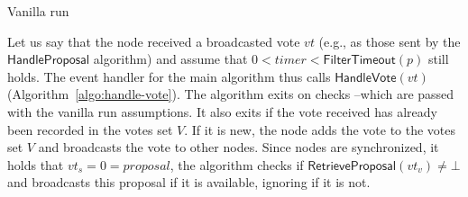 \documentclass[10pt,a4paper]{article}
\begin{document}
\begin{section}{Vanilla run}
    
    Let us say that the node received a broadcasted vote $vt$ (e.g., as those sent by the $\mathsf{HandleProposal}$ 
    algorithm) and assume that $0<timer<\mathsf{FilterTimeout}(p)$ still holds.
    The event handler for the main algorithm thus calls $\mathsf{HandleVote}(vt)$ (Algorithm~\ref{algo:handle-vote}).
    The algorithm exits on checks --which are passed with the vanilla run assumptions.
    It also exits if the vote received has already been recorded in the votes set $V$.
    If it is new, the node adds the vote to the votes set $V$ and broadcasts the vote 
    to other nodes.
    Since nodes are synchronized, it holds that $vt_s=0=proposal$, the algorithm checks if 
    $\mathsf{RetrieveProposal}(vt_v) \neq \bot$ and broadcasts this proposal if it is available, ignoring if it is not.
    

\end{section}
\end{document}
